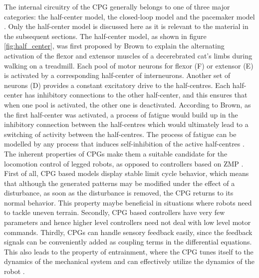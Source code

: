 \documentclass[12pt,twoside]{article}
\theoremstyle{plain}
\theoremstyle{definition}
\theoremstyle{remark}
\newcommand{\forceindent}{\leavevmode{\parindent=2em\indent}}
\begin{document}
\forceindent The internal circuitry of the CPG generally belongs to one of three major categories: the half-center model, the closed-loop model and the pacemaker model \cite{neurobiology1994shepherd}. Only the half-center model is discussed here as it is relevant to the material in the subsequent sections. The half-center model, as shown in figure \ref{fig:half_center}, was first proposed by Brown \cite{brown1914nature} to explain the alternating activation of the flexor and extensor muscles of a decerebrated cat's limbs during walking on a treadmill. Each pool of motor neurons for flexor (F) or extensor (E) is activated by a corresponding half-center of interneurons. Another set of neurons (D) provides a constant excitatory drive to the half-centres. Each half-center has inhibitory connections to the other half-center, and this ensures that when one pool is activated, the other one is deactivated. According to Brown, as the first half-center was activated, a process of fatigue would build up in the inhibitory connection between the half-centres which would ultimately lead to a switching of activity between the half-centres. The process of fatigue can be modelled by any process that induces self-inhibition of the active half-centres \cite{neurobiology1994shepherd}.\\
\forceindent The inherent properties of CPGs make them a suitable candidate for the locomotion control of legged robots, as opposed to controllers based on ZMP \cite{Ijspeert2008}. First of all, CPG based models display stable limit cycle behavior, which means that although the generated patterns may be modified under the effect of a disturbance, as soon as the disturbance is removed, the CPG returns to its normal behavior. This property maybe beneficial in situations where robots need to tackle uneven terrain. Secondly, CPG based controllers have very few parameters and hence higher level controllers need not deal with low level motor commands. Thirdly, CPGs can handle sensory feedback easily, since the feedback signals can be conveniently added as coupling terms in the differential equations. This also leads to the property of entrainment, where the CPG tunes itself to the dynamics of the mechanical system and can effectively utilize the dynamics of the robot \cite{Ijspeert2008}.
\end{document}
